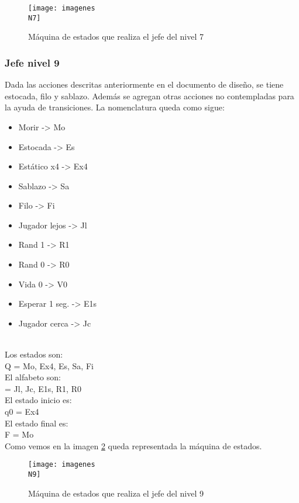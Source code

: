 \begin{figure}
	\centering
	\caption{Máquina de estados que realiza el jefe del nivel 7}
	\label{fig:maqN7}
	\texttt{[image: imagenes\\N7]}
\end{figure}

\subsubsection{Jefe nivel 9}
Dada las acciones descritas anteriormente en el documento de diseño, se tiene estocada, filo y sablazo. Además se agregan otras acciones no contempladas para la ayuda de transiciones.
La nomenclatura queda como sigue:
\\[1pt]

\begin{itemize}
	\item Morir -> Mo
	\item Estocada -> Es
	\item Estático x4 -> Ex4 
	\item Sablazo -> Sa
	\item Filo -> Fi
	\item Jugador lejos -> Jl
	\item Rand 1 -> R1
	\item Rand 0 -> R0
	\item Vida 0 -> V0
	\item Esperar 1 seg. -> E1s
	\item Jugador cerca -> Jc
\end{itemize}
\\[1pt]

Los estados son:
\\[1pt]
Q = {Mo, Ex4, Es, Sa, Fi}
\\[1pt]

El alfabeto son:
\\[1pt]
\sigma = {Jl, Jc, E1s, R1, R0}
\\[1pt]

El estado inicio es:
\\[1pt]
q0 = {Ex4}
\\[1pt]

El estado final es:
\\[1pt]
F = {Mo}
\\[1pt]


Como vemos en la imagen \ref{fig:maqN9} queda representada la máquina de estados.
\begin{figure}
	\centering
	\caption{Máquina de estados que realiza el jefe del nivel 9}
	\label{fig:maqN9}
	\texttt{[image: imagenes\\N9]}
\end{figure}